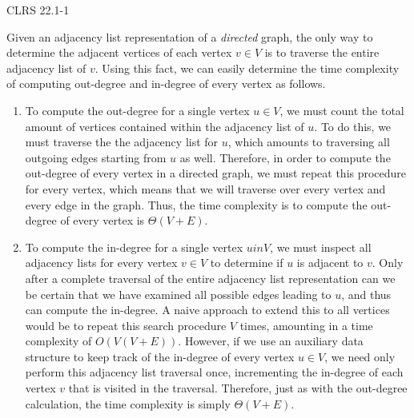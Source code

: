 \documentclass[11pt]{article}
\begin{document}
\begin{prob}{1}
CLRS 22.1-1 
\end{prob}
\begin{sol} 

Given an adjacency list representation of a \emph{directed} graph, the only way to determine the adjacent vertices of each vertex $v \in V$ is to traverse the entire adjacency list of $v$. Using this fact, we can easily determine the time complexity of computing out-degree and in-degree of every vertex as follows.

\begin{enumerate}
	\item To compute the out-degree for a single vertex $u \in V$, we must count the total amount of vertices contained within the adjacency list of $u$. To do this, we must traverse the the adjacency list for $u$, which amounts to traversing all outgoing edges starting from $u$ as well. Therefore, in order to compute the out-degree of every vertex in a directed graph, we must repeat this procedure for every vertex, which means that we will traverse over every vertex and every edge in the graph. Thus, the time complexity is to compute the out-degree of every vertex is $\Theta(V+ E)$.
	\item To compute the in-degree for a single vertex $u in V$, we must inspect all adjacency lists for every vertex $v \in V$ to determine if $u$ is adjacent to $v$. Only after a complete traversal of the entire adjacency list representation can we be certain that we have examined all possible edges leading to $u$, and thus can compute the in-degree. A naive approach to extend this to all vertices would be to repeat this search procedure $V$ times, amounting in a time complexity of $O(V(V+E))$. However, if we use an auxiliary data structure to keep track of the in-degree of every vertex $u \in V$, we need only perform this adjacency list traversal once, incrementing the in-degree of each vertex $v$ that is visited in the traversal. Therefore, just as with the out-degree calculation, the time complexity is simply $\Theta(V + E)$.
\end{enumerate}

\end{sol}
\end{document}
